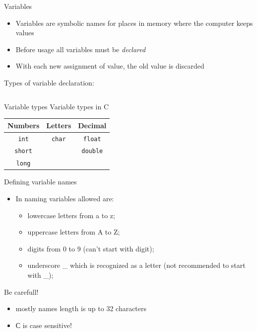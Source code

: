 \begin{frame}{Variables}
\begin{itemize}
\item Variables are symbolic names for places in memory where the
computer keeps values
\item Before usage all variables must be \emph{declared}
\item With each new assignment of value, the old value is discarded
\end{itemize}

Types of variable declaration:
\linebreak
\begin{columns}
         
         
         \fbox{ = }
         
         \fbox{ ; }
\end{columns}   

\end{frame}

\begin{frame}{Variable types}
\Large{Variable types in C}
\linebreak
\linebreak
\begin{tabular}{c|c|c}
\textbf{Numbers} & \textbf{Letters} & \textbf{Decimal}\\
\hline
\texttt{int} & \texttt{char} & \texttt{float} \\
\hline
\texttt{short} & & \texttt{double} \\
\hline
\texttt{long} & &
\end{tabular}
\end{frame}

\begin{frame}{Defining variable names}
\begin{itemize}
\item In naming variables allowed are:
\begin{itemize}
\item lowercase letters from a to z;
\item uppercase letters from A to Z;
\item digits from 0 to 9 (can't start with digit);
\item underscore \_ which is recognized as a letter (not recommended to start
with \_);
\end{itemize}
\end{itemize}
\begin{alertblock}{Be carefull!}
\begin{itemize}
\item mostly names length is up to 32 characters
\item С is case sensitive!
\end{itemize}
\end{alertblock}
\end{frame}

